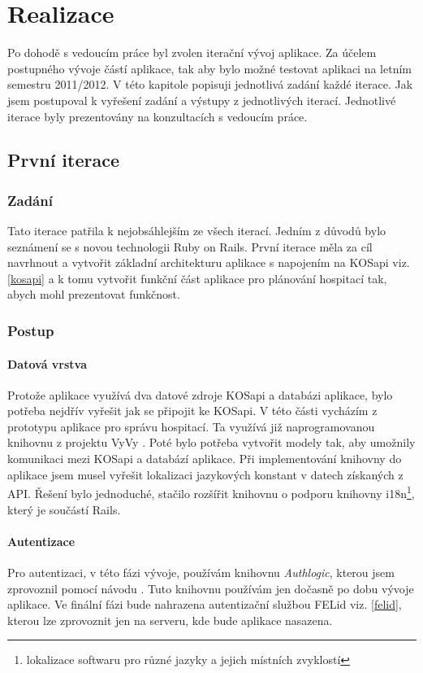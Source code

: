 \chapter{Realizace}
Po dohodě s vedoucím práce byl zvolen iterační vývoj aplikace. Za účelem postupného vývoje částí aplikace, tak aby bylo možné testovat aplikaci na letním semestru 2011/2012. V této kapitole popisuji jednotlivá zadání každé iterace. Jak jsem postupoval k vyřešení zadání a výstupy z jednotlivých iterací. Jednotlivé iterace byly prezentovány na konzultacích s vedoucím práce.

\section{První iterace}
\subsection{Zadání}
Tato iterace patřila k nejobsáhlejším ze všech iterací. Jedním z důvodů bylo  seznámení se s novou technologii Ruby on Rails. První iterace měla za cíl navrhnout a vytvořit základní architekturu aplikace s napojením na KOSapi viz. \ref{kosapi} a k tomu vytvořit funkční část aplikace pro plánování hospitací tak, abych mohl prezentovat funkčnost.

\subsection{Postup}
\subsubsection{Datová vrstva}
Protože aplikace využívá dva datové zdroje KOSapi  a databázi aplikace, bylo potřeba nejdřív vyřešit jak se připojit ke KOSapi. V této části vycházím z prototypu aplikace pro správu hospitací. Ta využívá již naprogramovanou knihovnu z projektu VyVy \cite{vyvy}. Poté bylo potřeba vytvořit modely tak, aby umožnily komunikaci mezi KOSapi a databází aplikace. Při implementování knihovny do aplikace jsem musel vyřešit lokalizaci jazykových konstant v datech získaných z API. Řešení bylo jednoduché, stačilo rozšířit knihovnu o podporu knihovny i18n\footnote{lokalizace softwaru pro různé jazyky a jejich místních zvyklostí}, který je součástí Rails.

\subsubsection{Autentizace}
Pro autentizaci, v této fázi vývoje, používám knihovnu \textit{Authlogic}, kterou jsem zprovoznil pomocí návodu \cite{authlogic}. Tuto knihovnu používám jen dočasně po dobu vývoje aplikace. Ve finální fázi bude nahrazena autentizační službou FELid viz. \ref{felid}, kterou lze zprovoznit jen na serveru, kde bude aplikace nasazena. 

